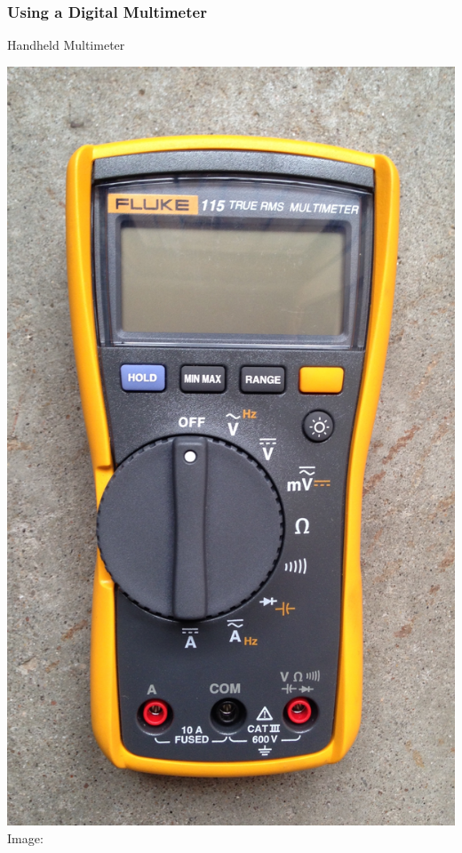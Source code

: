 \documentclass[fleqn]{beamer} %
\newcommand{\sectiontitleII}{Using a Digital Multimeter}
\begin{document}
	\begin{frame}  \scriptsize
		\frametitle{\sectiontitleII}
		Handheld Multimeter

		\begin{multicols}{3}
			 
		\includegraphics[scale=0.04]{Fluke_115_multimeter.jpeg}
		\tiny{Image:\href{https://commons.wikimedia.org/wiki/File:Fluke_115_multimeter.jpg}{}}	 


\end{multicols}
\end{frame}
\end{document}
